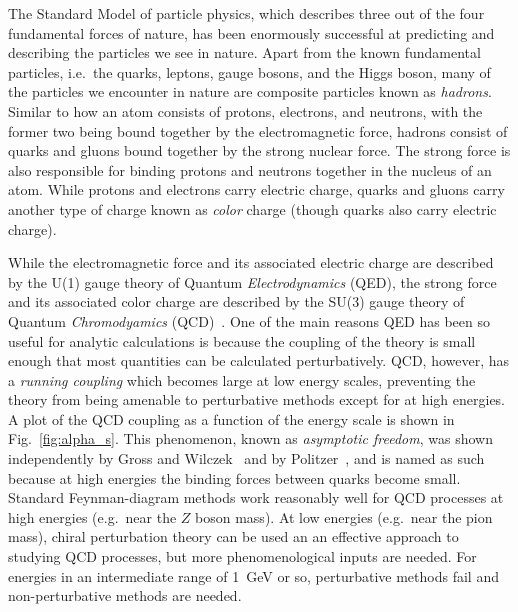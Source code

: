 The Standard Model of particle physics, which describes three out of the four fundamental forces of nature, has been enormously successful at predicting and describing the particles we see in nature. Apart from the known fundamental particles, i.e.\ the quarks, leptons, gauge bosons, and the Higgs boson, many of the particles we encounter in nature are composite particles known as \emph{hadrons}. Similar to how an atom consists of protons, electrons, and neutrons, with the former two being bound together by the electromagnetic force, hadrons consist of quarks and gluons bound together by the strong nuclear force. The strong force is also responsible for binding protons and neutrons together in the nucleus of an atom.  While protons and electrons carry electric charge, quarks and gluons carry another type of charge known as \emph{color} charge (though quarks also carry electric charge).

While the electromagnetic force and its associated electric charge are described by the U(1) gauge theory of Quantum \emph{Electrodynamics} (QED), the strong force and its associated color charge are described by the SU(3) gauge theory of Quantum \emph{Chromodyamics} (QCD)~\cite{Fritzsch:1973pi}. One of the main reasons QED has been so useful for analytic calculations is because the coupling of the theory is small enough that most quantities can be calculated perturbatively. QCD, however, has a \emph{running coupling} which becomes large at low energy scales, preventing the theory from being amenable to perturbative methods except for at high energies. A plot of the QCD coupling as a function of the energy scale is shown in Fig.~\ref{fig:alpha_s}. This phenomenon, known as \emph{asymptotic freedom}, was shown independently by Gross and Wilczek~\cite{Gross:1973id} and by Politzer~\cite{Politzer:1973fx}, and is named as such because at high energies the binding forces between quarks become small. Standard Feynman-diagram methods work reasonably well for QCD processes at high energies (e.g.\ near the $Z$ boson mass). At low energies (e.g.\ near the pion mass), chiral perturbation theory can be used an an effective approach to studying QCD processes, but more phenomenological inputs are needed.  For energies in an intermediate range of 1~GeV or so, perturbative methods fail and non-perturbative methods are needed.

